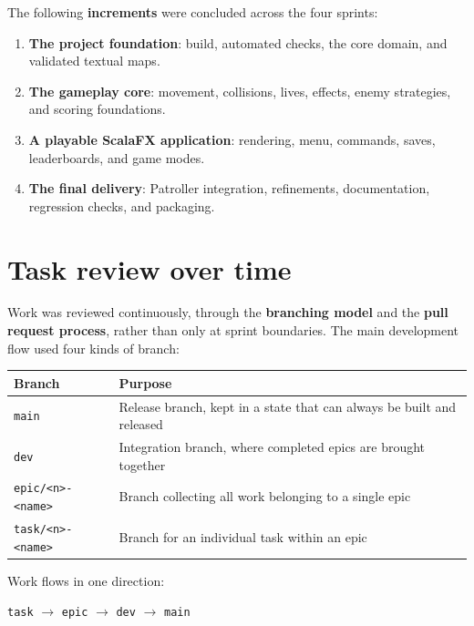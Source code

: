 The following \textbf{increments} were concluded across the four sprints:

\begin{enumerate}
  \item \textbf{The project foundation}: build, automated checks, the core domain, and validated textual maps.
  \item \textbf{The gameplay core}: movement, collisions, lives, effects, enemy strategies, and scoring foundations.
  \item \textbf{A playable ScalaFX application}: rendering, menu, commands, saves, leaderboards, and game modes.
  \item \textbf{The final delivery}: Patroller integration, refinements, documentation, regression checks, and packaging.
\end{enumerate}

\section{Task review over time}

Work was reviewed continuously, through the \textbf{branching model} and the \textbf{pull request process}, rather than only at sprint
boundaries. The main development flow used four kinds of branch:

\begin{center}
    \begin{tabular}{|l|p{9cm}|}
        \hline
        \textbf{Branch} & \textbf{Purpose} \\
        \hline
        \texttt{main} & Release branch, kept in a state that can always be built and released \\
        \texttt{dev} & Integration branch, where completed epics are brought together \\
        \texttt{epic/<n>-<name>} & Branch collecting all work belonging to a single epic \\
        \texttt{task/<n>-<name>} & Branch for an individual task within an epic \\
        \hline
    \end{tabular}
\end{center}

Work flows in one direction:

\begin{center}
\texttt{task} $\rightarrow$ \texttt{epic} $\rightarrow$ \texttt{dev} $\rightarrow$ \texttt{main}
\end{center}

